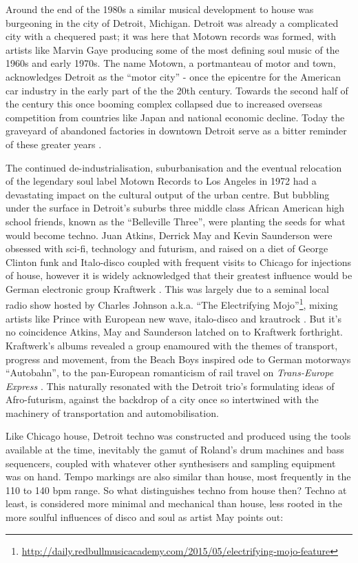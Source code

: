 Around the end of the 1980s a similar musical development to house was burgeoning in the city of Detroit, Michigan. Detroit was already a complicated city with a chequered past; it was here that Motown records was formed, with artists like Marvin Gaye producing some of the most defining soul music of the 1960s and early 1970s. The name Motown, a portmanteau of motor and town,  acknowledges Detroit  as the “motor city” - once the epicentre for the American car industry in the early part of the the 20th century. Towards the second half of the century this once booming complex collapsed due to increased overseas competition from countries like Japan and national economic decline. Today the graveyard of abandoned factories in downtown Detroit serve as a bitter reminder of these greater years \citep{Sicko2010}.

The continued de-industrialisation, suburbanisation and the eventual relocation of the legendary soul label Motown Records to Los Angeles in 1972 had a devastating impact on the cultural output of the urban centre. But bubbling under the surface in Detroit's suburbs three middle class African American high school friends, known as the “Belleville Three”,  were planting the seeds for what would become techno. Juan Atkins, Derrick May and Kevin Saunderson were obsessed with sci-fi, technology and futurism, and raised on a diet of George Clinton funk and Italo-disco coupled with frequent visits to Chicago for injections of house, however it is widely acknowledged that their greatest influence would be German electronic group Kraftwerk \citep{Pope2011}. This was largely due to a seminal local radio show hosted by Charles Johnson a.k.a. “The Electrifying Mojo”\footnote{\url{http://daily.redbullmusicacademy.com/2015/05/electrifying-mojo-feature}}, mixing artists like Prince with European new wave, italo-disco and krautrock \citep{Reynolds2013, Sicko2010}. But it’s no coincidence Atkins, May and Saunderson latched on to Kraftwerk forthright. Kraftwerk’s albums revealed a group enamoured with the themes of transport, progress and movement, from the Beach Boys inspired ode to German motorways  “Autobahn”, to the pan-European romanticism of rail travel on \textit{Trans-Europe Express} \citep{Albiez2010}. This naturally resonated with the Detroit trio’s formulating ideas of Afro-futurism, against the backdrop of a city once so intertwined with the machinery of transportation and automobilisation.

Like Chicago house, Detroit techno was constructed and produced using the tools available at the time, inevitably the gamut of Roland’s drum machines and bass sequencers, coupled with whatever other synthesisers and sampling equipment was on hand. Tempo markings are also similar than house, most frequently in the 110 to 140 bpm range. So what distinguishes techno from house then? Techno at least, is considered more minimal and mechanical than house, less rooted in the more soulful influences of disco and soul as artist May points out:  

